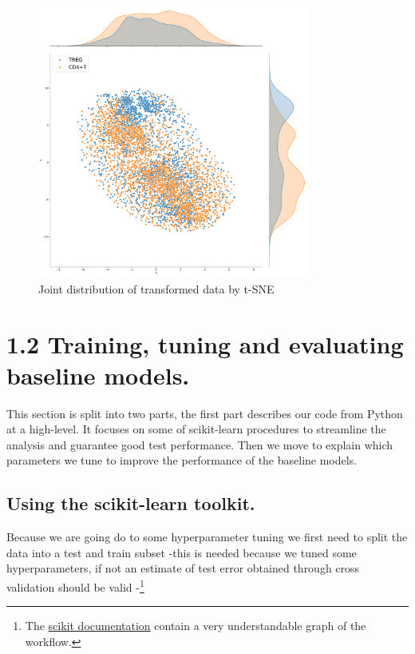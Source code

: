 \documentclass{article}
\begin{document}
\begin{figure}[h]
    \centering
    \includegraphics[width=0.8\textwidth]{t11_joint_tsne.pdf}
    \caption{Joint distribution of transformed data by t-SNE}\label{fig:tsne}
\end{figure}

\section{1.2 Training, tuning and evaluating baseline models.}
This section is split into two parts, the first part describes our code from Python at a high-level. It focuses on some of scikit-learn procedures to streamline the analysis 
and guarantee good test performance. Then we move to explain which parameters we tune to improve the performance of the baseline models.

\subsection{Using the scikit-learn toolkit.}
Because we are going do to some hyperparameter tuning we first need to split the data into a test and train subset -this is needed because we tuned some hyperparameters, if not an estimate of test error obtained through cross validation should be valid -\footnote{The \href{https://scikit-learn.org/1.5/modules/cross_validation.html}{scikit documentation} contain a very understandable graph of the workflow.}
\end{document}

